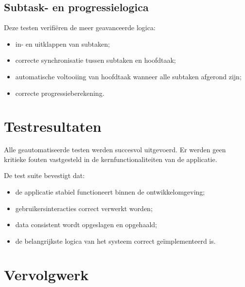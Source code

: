 \subsection{Subtask- en progressielogica}

Deze testen verifiëren de meer geavanceerde logica:

\begin{itemize}
    \item in- en uitklappen van subtaken;
    \item correcte synchronisatie tussen subtaken en hoofdtaak;
    \item automatische voltooiing van hoofdtaak wanneer alle subtaken afgerond zijn;
    \item correcte progressieberekening.
\end{itemize}

\section{Testresultaten}

Alle geautomatiseerde testen werden succesvol uitgevoerd. Er werden geen kritieke fouten vastgesteld in de kernfunctionaliteiten van de applicatie.

De test suite bevestigt dat:

\begin{itemize}
    \item de applicatie stabiel functioneert binnen de ontwikkelomgeving;
    \item gebruikersinteracties correct verwerkt worden;
    \item data consistent wordt opgeslagen en opgehaald;
    \item de belangrijkste logica van het systeem correct geïmplementeerd is.
\end{itemize}

\section{Vervolgwerk}

